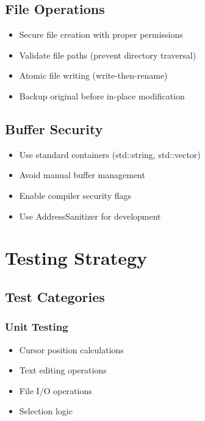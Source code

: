 \documentclass[12pt,a4paper,oneside,openany]{report}
\begin{document}
\section{File Operations}

\begin{itemize}
	\item Secure file creation with proper permissions
	\item Validate file paths (prevent directory traversal)
	\item Atomic file writing (write-then-rename)
	\item Backup original before in-place modification
\end{itemize}

\section{Buffer Security}

\begin{itemize}
	\item Use standard containers (std::string, std::vector)
	\item Avoid manual buffer management
	\item Enable compiler security flags
	\item Use AddressSanitizer for development
\end{itemize}

\chapter{Testing Strategy}

\section{Test Categories}

\subsection{Unit Testing}

\begin{itemize}
	\item Cursor position calculations
	\item Text editing operations
	\item File I/O operations
	\item Selection logic
\end{itemize}
\end{document}
